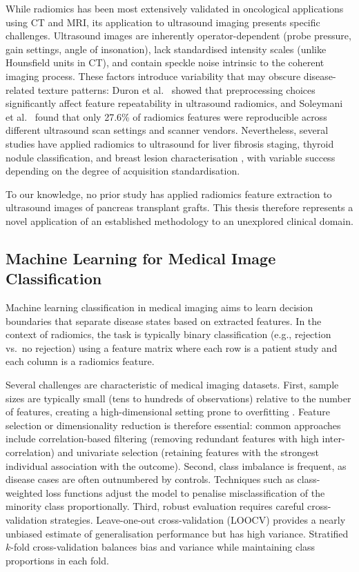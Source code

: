 While radiomics has been most extensively validated in oncological applications using CT and MRI, its application to ultrasound imaging presents specific challenges. Ultrasound images are inherently operator-dependent (probe pressure, gain settings, angle of insonation), lack standardised intensity scales (unlike Hounsfield units in CT), and contain speckle noise intrinsic to the coherent imaging process. These factors introduce variability that may obscure disease-related texture patterns: Duron et al.\ \cite{duron2021} showed that preprocessing choices significantly affect feature repeatability in ultrasound radiomics, and Soleymani et al.\ \cite{soleymani2022} found that only 27.6\% of radiomics features were reproducible across different ultrasound scan settings and scanner vendors. Nevertheless, several studies have applied radiomics to ultrasound for liver fibrosis staging, thyroid nodule classification, and breast lesion characterisation \cite{wang2019liver, park2021thyroid, romeo2021breast}, with variable success depending on the degree of acquisition standardisation.

To our knowledge, no prior study has applied radiomics feature extraction to ultrasound images of pancreas transplant grafts. This thesis therefore represents a novel application of an established methodology to an unexplored clinical domain.

\subsection{Machine Learning for Medical Image Classification}

Machine learning classification in medical imaging aims to learn decision boundaries that separate disease states based on extracted features. In the context of radiomics, the task is typically binary classification (e.g., rejection vs.\ no rejection) using a feature matrix where each row is a patient study and each column is a radiomics feature.

Several challenges are characteristic of medical imaging datasets. First, sample sizes are typically small (tens to hundreds of observations) relative to the number of features, creating a high-dimensional setting prone to overfitting \cite{vabalas2019}. Feature selection or dimensionality reduction is therefore essential: common approaches include correlation-based filtering (removing redundant features with high inter-correlation) and univariate selection (retaining features with the strongest individual association with the outcome). Second, class imbalance is frequent, as disease cases are often outnumbered by controls. Techniques such as class-weighted loss functions adjust the model to penalise misclassification of the minority class proportionally. Third, robust evaluation requires careful cross-validation strategies. Leave-one-out cross-validation (LOOCV) provides a nearly unbiased estimate of generalisation performance but has high variance. Stratified $k$-fold cross-validation balances bias and variance while maintaining class proportions in each fold.

